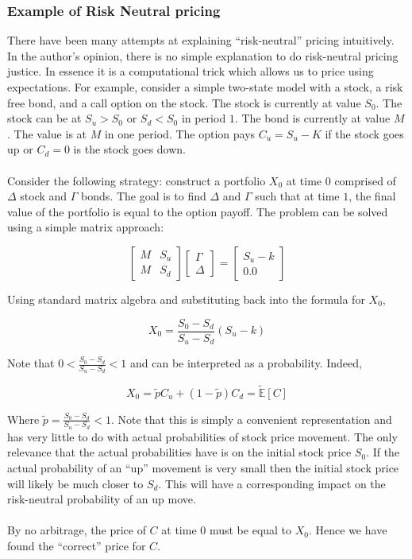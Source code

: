 \documentclass{article}
\theoremstyle{definition}
\begin{document}
\subsubsection{Example of Risk Neutral pricing} \label{RNExample}
There have been many attempts at explaining ``risk-neutral'' pricing intuitively.  In the author's opinion, there is no simple explanation to do risk-neutral pricing justice.  In essence it is a computational trick which allows us to price using expectations.  For example, consider a simple two-state model with a stock, a risk free bond, and a call option on the stock.  The stock is currently at value \(S_0\).  The stock can be at \(S_u>S_0\) or \(S_d<S_0\) in period \(1\).  The bond is currently at value \(M\).  The value is at \(M\) in one period.  The option pays \(C_u=S_u-K\) if the stock goes up or \(C_d=0\) is the stock goes down.  
\\
\\
Consider the following strategy: construct a portfolio \(X_0\) at time \(0\) comprised of \(\Delta\) stock and \(\Gamma\) bonds.  The goal is to find \(\Delta\) and \(\Gamma\) such that at time \(1\), the final value of the portfolio is equal to the option payoff.  The problem can be solved using a simple matrix approach:

\[
\begin{bmatrix}
	M & S_u \\
	M & S_d 
\end{bmatrix}
\begin{bmatrix}
\Gamma \\
\Delta 
\end{bmatrix}
=
\begin{bmatrix}
S_u-k \\
0.0
\end{bmatrix}
\]

Using standard matrix algebra and substituting back into the formula for \(X_0\), 

\[X_0=\frac{S_0-S_d}{S_u-S_d}\left(S_u-k\right)\]

Note that \(0<\frac{S_0-S_d}{S_u-S_d}<1\) and can be interpreted as a probability.  Indeed, 

\[X_0=\tilde{p}C_u+(1-\tilde{p})C_d =\mathbb{\tilde{E}}[C]\]

Where \(\tilde{p}=\frac{S_0-S_d}{S_u-S_d}<1\).  Note that this is simply a convenient representation and has very little to do with actual probabilities of stock price movement.  The only relevance that the actual probabilities have is on the initial stock price \(S_0\).  If the actual probability of an ``up'' movement is very small then the initial stock price will likely be much closer to \(S_d\).  This will have a corresponding impact on the risk-neutral probability of an up move.  
\\
\\
By no arbitrage, the price of \(C\) at time \(0\) must be equal to \(X_0\).  Hence we have found the ``correct'' price for \(C\).  
\end{document}
